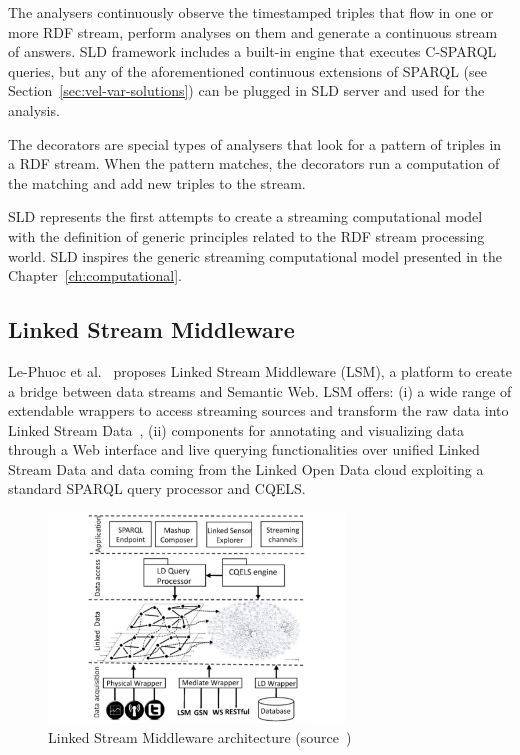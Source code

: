 The \textsf{analysers} continuously observe the timestamped triples that flow in one or more RDF stream, perform analyses on them and generate a continuous stream of answers. SLD framework includes a built-in engine that executes C-SPARQL queries, but any of the aforementioned continuous extensions of SPARQL (see Section~\ref{sec:vel-var-solutions}) can be plugged in SLD server and used for the analysis. 

The \textsf{decorators} are special types of analysers that look for a pattern of triples in a RDF stream. When the pattern matches, the decorators run a computation of the matching and add new triples to the stream.

SLD represents the first attempts to create a streaming computational model with the definition of generic principles related to the RDF stream processing world. SLD inspires the generic streaming computational model presented in the Chapter~\ref{ch:computational}.

\subsection{Linked Stream Middleware}
Le-Phuoc et al.~\cite{DBLP:journals/ws/PhuocNPH12} proposes Linked Stream Middleware (LSM), a platform to create a bridge between data streams and Semantic Web.
LSM offers: (i) a wide range of extendable wrappers to access streaming sources and transform the raw data into Linked Stream Data~\cite{DBLP:conf/semweb/SequedaC09}, (ii) components for annotating and visualizing data through a Web interface and live querying functionalities over unified Linked Stream Data and data coming from the Linked Open Data cloud exploiting a standard SPARQL query processor and CQELS.

\begin{figure}[h]
\begin{center}
\includegraphics[width=0.7\textwidth]{img/lsm}
\caption{Linked Stream Middleware architecture (source~\cite{DBLP:journals/ws/PhuocNPH12})}
\label{fig:lsm-arch}
\end{center}
\end{figure}

